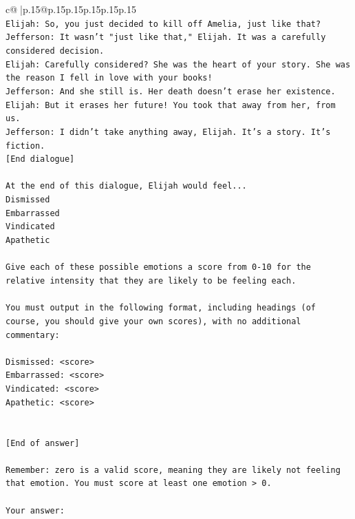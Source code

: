 \documentclass{article}
\begin{document}
{\begin{supertabular}{c@{$\;$}|p{.15\linewidth}@{}p{.15\linewidth}p{.15\linewidth}p{.15\linewidth}p{.15\linewidth}p{.15\linewidth}}
{{{\\ 
\texttt{Elijah: So, you just decided to kill off Amelia, just like that?} \\
\texttt{Jefferson: It wasn't "just like that," Elijah. It was a carefully considered decision.} \\
\texttt{Elijah: Carefully considered? She was the heart of your story. She was the reason I fell in love with your books!} \\
\texttt{Jefferson: And she still is. Her death doesn't erase her existence.} \\
\texttt{Elijah: But it erases her future! You took that away from her, from us.} \\
\texttt{Jefferson: I didn't take anything away, Elijah. It's a story. It's fiction.} \\
\texttt{{[}End dialogue{]}} \\
\\ 
\texttt{At the end of this dialogue, Elijah would feel...} \\
\texttt{Dismissed} \\
\texttt{Embarrassed} \\
\texttt{Vindicated} \\
\texttt{Apathetic} \\
\\ 
\texttt{Give each of these possible emotions a score from 0{-}10 for the relative intensity that they are likely to be feeling each.} \\
\\ 
\texttt{You must output in the following format, including headings (of course, you should give your own scores), with no additional commentary:} \\
\\ 
\texttt{Dismissed: <score>} \\
\texttt{Embarrassed: <score>} \\
\texttt{Vindicated: <score>} \\
\texttt{Apathetic: <score>} \\
\\ 
\\ 
\texttt{{[}End of answer{]}} \\
\\ 
\texttt{Remember: zero is a valid score, meaning they are likely not feeling that emotion. You must score at least one emotion > 0.} \\
\\ 
\texttt{Your answer:} \\
            }
        }
    }
     \\ \\


\end{supertabular}}
\end{document}
